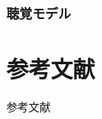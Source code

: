 \documentclass[14pt,xcolor=dvipsnames,table,dvipdfmx]{beamer}
\begin{document}
\begin{frame}[c]
    \frametitle{聴覚モデル}
\end{frame}

\appendix

\section{参考文献}

\begin{frame}[allowframebreaks]{参考文献}
    \scriptsize
    \printbibliography[heading=none]
\end{frame}

% 
% 
% 
\end{document}
